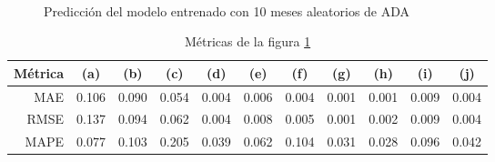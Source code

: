 \documentclass[a4paper,10pt]{article}
\begin{document}
\begin{figure}[H]
    \\
  \caption{Predicción del modelo entrenado con 10 meses aleatorios de ADA}
  \label{f:ada_mth_arima}
\end{figure}

\begin{table}[H]
 \begin{center}
  \begin{tabular}{|r|c|c|c|c|c|c|c|c|c|c|}
    Métrica & (a) & (b) & (c) & (d) & (e) & (f) & (g) & (h) & (i) & (j) \\ \hline
    MAE & 0.106 & 0.090 & 0.054 & 0.004 & 0.006 & 0.004 & 0.001 & 0.001 & 0.009 & 0.004 \\
    RMSE & 0.137 & 0.094 & 0.062 & 0.004 & 0.008 & 0.005 & 0.001 & 0.002 & 0.009 & 0.004\\
    MAPE & 0.077 & 0.103 & 0.205 & 0.039 & 0.062 & 0.104 & 0.031 & 0.028 & 0.096 & 0.042 \\ \hline
  \end{tabular}
  \caption{Métricas de la figura \ref{f:ada_mth_arima}}
  \label{tab:ada_m}
 \end{center}
\end{table}
\end{document}
